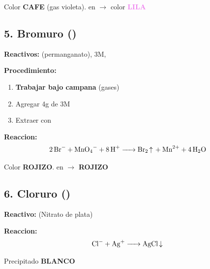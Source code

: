 \documentclass[11pt,a4paper]{article}
\begin{document}
\begin{resultado}
Color \textbf{CAFE} (gas violeta).  en  $\rightarrow$ color \textbf{\textcolor{violet}{LILA}}
\end{resultado}

\subsection{5. Bromuro ()}

\textbf{Reactivos:}  (permanganato),  3M, 

\textbf{Procedimiento:}
\begin{enumerate}[leftmargin=*]
    \item \textbf{Trabajar bajo campana} (gases)
    \item Agregar 4g de  3M
    \item Extraer  con 
\end{enumerate}

\begin{reaccionbox}
\textbf{Reaccion:}
\begin{equation*}
\ce{2Br^- + MnO4^- + 8H^+ -> Br2 ^ + Mn^{2+} + 4H2O}
\end{equation*}
\end{reaccionbox}

\begin{resultado}
Color \textbf{\textcolor{rojo}{ROJIZO}}.  en  $\rightarrow$ \textbf{\textcolor{rojo}{ROJIZO}}
\end{resultado}

\subsection{6. Cloruro ()}

\textbf{Reactivo:}  (Nitrato de plata)

\begin{reaccionbox}
\textbf{Reaccion:}
\begin{equation*}
\ce{Cl^- + Ag^+ -> AgCl v}
\end{equation*}
\end{reaccionbox}

\begin{resultado}
Precipitado \textbf{BLANCO}
\end{resultado}
\end{document}
